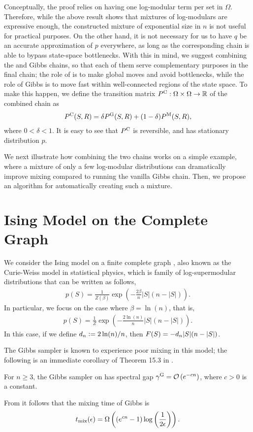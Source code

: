 Conceptually, the proof relies on having one log-modular term per set in $\Omega$.
Therefore, while the above result shows that mixtures of log-modulars are expressive enough, the constructed mixture of exponential size in $n$ is not useful for practical purposes.
On the other hand, it is not necessary for us to have $q$ be an accurate approximation of $p$ everywhere, as long as the corresponding \Ms{} chain is able to bypass state-space bottlenecks.
With this in mind, we suggest combining the \Ms{} and Gibbs chains, so that each of them serve complementary purposes in the final chain; the role of \Ms{} is to make global moves and avoid bottlenecks, while the role of Gibbs is to move fast within well-connected regions of the state space.
To make this happen, we define the transition matrix $P^{\mathrm{C}} : \Omega \times \Omega \to \mathbb{R}$ of the combined chain as
\begin{align} \label{eq:cdef}
  P^{\mathrm{C}}(S, R) = \delta P^{\mathrm{G}}(S, R) + (1-\delta)P^{\mathrm{M}}(S, R),
\end{align}
where $0 < \delta < 1$.
It is easy to see that $P^{\mathrm{C}}$ is reversible, and has stationary distribution $p$.

We next illustrate how combining the two chains works on a simple example, where a mixture of only a few log-modular distributions can dramatically improve mixing compared to running the vanilla Gibbs chain.
Then, we propose an algorithm for automatically creating such a mixture.

\section{Ising Model on the Complete Graph} \label{sect:ising}
We consider the Ising model on a finite complete graph \citep{levin08}, also known as the Curie-Weiss model in statistical physics, which is family of log-supermodular distributions that can be written as follows,
\begin{align*}
  p(S) = \frac{1}{Z(\beta)}\exp\left(-\frac{2\beta}{n} |S|(n-|S|)\right). \tag{\isingb}
\end{align*}
In particular, we focus on the case where $\beta = \ln(n)$, that is,
\begin{align*}
  p(S) = \frac{1}{Z}\exp\left(-\frac{2\ln(n)}{n} |S|(n-|S|)\right). \tag{\ising}
\end{align*}
In this case, if we define $d_n \vcentcolon= 2 \ln(n) / n$, then $F(S) = -d_n |S|(n-|S|)$.

The Gibbs sampler is known to experience poor mixing in this model; the following is an immediate corollary of Theorem 15.3 in \citep{levin08book}.
\begin{cor}
  For $n \geq 3$, the Gibbs sampler on \ising{} has spectral gap $\gamma^{\mathrm{G}} = \mathcal{O}\left(e^{-cn}\right)$, where $c > 0$ is a constant.
\end{cor}
\noindent From  it follows that the mixing time of Gibbs is
\begin{align*}
    t_{\mathrm{mix}}(\epsilon) = \Omega\left((e^{cn} - 1)\log\left(\frac{1}{2\epsilon}\right) \right).
\end{align*}

